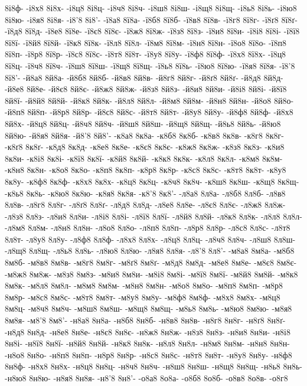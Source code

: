 {8і8ф-
-і8х8
8і8х-
-і8ц8
8і8ц-
-і8ч8
8і8ч-
-і8ш8
8і8ш-
-і8щ8
8і8щ-
-і8ь8
8і8ь-
-і8ю8
8і8ю-
-і8я8
8і8я-
-і8'8
8і8'-
-ї8а8
8ї8а-
-ї8б8
8ї8б-
-ї8в8
8ї8в-
-ї8г8
8ї8г-
-ї8ґ8
8ї8ґ-
-ї8д8
8ї8д-
-ї8е8
8ї8е-
-ї8є8
8ї8є-
-ї8ж8
8ї8ж-
-ї8з8
8ї8з-
-ї8и8
8ї8и-
-ї8і8
8ї8і-
-ї8ї8
8ї8ї-
-ї8й8
8ї8й-
-ї8к8
8ї8к-
-ї8л8
8ї8л-
-ї8м8
8ї8м-
-ї8н8
8ї8н-
-ї8о8
8ї8о-
-ї8п8
8ї8п-
-ї8р8
8ї8р-
-ї8с8
8ї8с-
-ї8т8
8ї8т-
-ї8у8
8ї8у-
-ї8ф8
8ї8ф-
-ї8х8
8ї8х-
-ї8ц8
8ї8ц-
-ї8ч8
8ї8ч-
-ї8ш8
8ї8ш-
-ї8щ8
8ї8щ-
-ї8ь8
8ї8ь-
-ї8ю8
8ї8ю-
-ї8я8
8ї8я-
-ї8'8
8ї8'-
-й8а8
8й8а-
-й8б8
8й8б-
-й8в8
8й8в-
-й8г8
8й8г-
-й8ґ8
8й8ґ-
-й8д8
8й8д-
-й8е8
8й8е-
-й8є8
8й8є-
-й8ж8
8й8ж-
-й8з8
8й8з-
-й8и8
8й8и-
-й8і8
8й8і-
-й8ї8
8й8ї-
-й8й8
8й8й-
-й8к8
8й8к-
-й8л8
8й8л-
-й8м8
8й8м-
-й8н8
8й8н-
-й8о8
8й8о-
-й8п8
8й8п-
-й8р8
8й8р-
-й8с8
8й8с-
-й8т8
8й8т-
-й8у8
8й8у-
-й8ф8
8й8ф-
-й8х8
8й8х-
-й8ц8
8й8ц-
-й8ч8
8й8ч-
-й8ш8
8й8ш-
-й8щ8
8й8щ-
-й8ь8
8й8ь-
-й8ю8
8й8ю-
-й8я8
8й8я-
-й8'8
8й8'-
-к8а8
8к8а-
-к8б8
8к8б-
-к8в8
8к8в-
-к8г8
8к8г-
-к8ґ8
8к8ґ-
-к8д8
8к8д-
-к8е8
8к8е-
-к8є8
8к8є-
-к8ж8
8к8ж-
-к8з8
8к8з-
-к8и8
8к8и-
-к8і8
8к8і-
-к8ї8
8к8ї-
-к8й8
8к8й-
-к8к8
8к8к-
-к8л8
8к8л-
-к8м8
8к8м-
-к8н8
8к8н-
-к8о8
8к8о-
-к8п8
8к8п-
-к8р8
8к8р-
-к8с8
8к8с-
-к8т8
8к8т-
-к8у8
8к8у-
-к8ф8
8к8ф-
-к8х8
8к8х-
-к8ц8
8к8ц-
-к8ч8
8к8ч-
-к8ш8
8к8ш-
-к8щ8
8к8щ-
-к8ь8
8к8ь-
-к8ю8
8к8ю-
-к8я8
8к8я-
-к8'8
8к8'-
-л8а8
8л8а-
-л8б8
8л8б-
-л8в8
8л8в-
-л8г8
8л8г-
-л8ґ8
8л8ґ-
-л8д8
8л8д-
-л8е8
8л8е-
-л8є8
8л8є-
-л8ж8
8л8ж-
-л8з8
8л8з-
-л8и8
8л8и-
-л8і8
8л8і-
-л8ї8
8л8ї-
-л8й8
8л8й-
-л8к8
8л8к-
-л8л8
8л8л-
-л8м8
8л8м-
-л8н8
8л8н-
-л8о8
8л8о-
-л8п8
8л8п-
-л8р8
8л8р-
-л8с8
8л8с-
-л8т8
8л8т-
-л8у8
8л8у-
-л8ф8
8л8ф-
-л8х8
8л8х-
-л8ц8
8л8ц-
-л8ч8
8л8ч-
-л8ш8
8л8ш-
-л8щ8
8л8щ-
-л8ь8
8л8ь-
-л8ю8
8л8ю-
-л8я8
8л8я-
-л8'8
8л8'-
-м8а8
8м8а-
-м8б8
8м8б-
-м8в8
8м8в-
-м8г8
8м8г-
-м8ґ8
8м8ґ-
-м8д8
8м8д-
-м8е8
8м8е-
-м8є8
8м8є-
-м8ж8
8м8ж-
-м8з8
8м8з-
-м8и8
8м8и-
-м8і8
8м8і-
-м8ї8
8м8ї-
-м8й8
8м8й-
-м8к8
8м8к-
-м8л8
8м8л-
-м8м8
8м8м-
-м8н8
8м8н-
-м8о8
8м8о-
-м8п8
8м8п-
-м8р8
8м8р-
-м8с8
8м8с-
-м8т8
8м8т-
-м8у8
8м8у-
-м8ф8
8м8ф-
-м8х8
8м8х-
-м8ц8
8м8ц-
-м8ч8
8м8ч-
-м8ш8
8м8ш-
-м8щ8
8м8щ-
-м8ь8
8м8ь-
-м8ю8
8м8ю-
-м8я8
8м8я-
-м8'8
8м8'-
-н8а8
8н8а-
-н8б8
8н8б-
-н8в8
8н8в-
-н8г8
8н8г-
-н8ґ8
8н8ґ-
-н8д8
8н8д-
-н8е8
8н8е-
-н8є8
8н8є-
-н8ж8
8н8ж-
-н8з8
8н8з-
-н8и8
8н8и-
-н8і8
8н8і-
-н8ї8
8н8ї-
-н8й8
8н8й-
-н8к8
8н8к-
-н8л8
8н8л-
-н8м8
8н8м-
-н8н8
8н8н-
-н8о8
8н8о-
-н8п8
8н8п-
-н8р8
8н8р-
-н8с8
8н8с-
-н8т8
8н8т-
-н8у8
8н8у-
-н8ф8
8н8ф-
-н8х8
8н8х-
-н8ц8
8н8ц-
-н8ч8
8н8ч-
-н8ш8
8н8ш-
-н8щ8
8н8щ-
-н8ь8
8н8ь-
-н8ю8
8н8ю-
-н8я8
8н8я-
-н8'8
8н8'-
-о8а8
8о8а-
-о8б8
8о8б-
-о8в8
8о8в-
-о8г8
}
